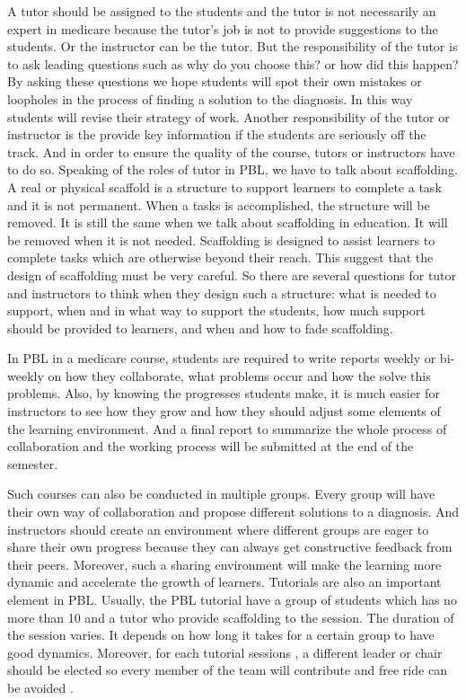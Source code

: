 \documentclass[sigconf]{acmart}
\begin{document}
A tutor should be assigned to the students and the tutor is not necessarily an expert in medicare because the tutor's job is not to provide suggestions to the students. Or the instructor can be the tutor. But the responsibility of the tutor is to ask leading questions such as why do you choose this? or how did this happen? By asking these questions we hope students will spot their own mistakes or loopholes in the process of finding a solution to the diagnosis. In this way students will revise their strategy of work. Another responsibility of the tutor or instructor is the provide key information if the students are seriously off the track. And in order to ensure the quality of the course, tutors or instructors have to do so. Speaking of the roles of tutor in PBL, we have to talk about scaffolding. A real or physical scaffold is a structure to support learners to complete a task and it is not permanent. When a tasks is accomplished, the structure will be removed. It is still the same when we talk about scaffolding in education. It will be removed when it is not needed. Scaffolding is designed to assist learners to complete tasks which are otherwise beyond their reach. This suggest that the design of scaffolding must be very careful. So there are several questions for tutor and instructors to think when they design such a structure: what is needed to support, when and in what way to support the students, how much support should be provided to learners, and when and how to fade scaffolding.


In PBL in a medicare course, students are required to write reports weekly or bi-weekly on how they collaborate, what problems occur and how the solve this problems. Also, by knowing the progresses students make, it is much easier for instructors to see how they grow and how they should adjust some elements of the learning environment. And a final report to summarize the whole process of collaboration and the working process will be submitted at the end of the semester.

Such courses can also be conducted in multiple groups. Every group will have their own way of collaboration and propose different solutions to a diagnosis. And instructors should create an environment where different groups are eager to share their own progress because they can always get constructive feedback from their peers. Moreover, such a sharing environment will make the learning more dynamic and accelerate the growth of learners.  Tutorials are also an important element in PBL. Usually, the PBL tutorial have a group of students which has no more than 10 and a tutor who provide scaffolding to the session. The duration of the session varies. It depends on how long it takes for a certain group to have good dynamics.  Moreover, for each tutorial sessions , a different leader or chair should be elected so every member of the team will contribute and free ride can be avoided \cite{Wood2003}.\\
\end{document}

